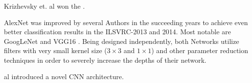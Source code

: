 Krizhevsky et. al \cite{AlexNet} won the .

AlexNet was improved by several Authors in the succeeding years to achieve even better classification results in the ILSVRC-2013 and 2014. Most notable are GoogLeNet \cite{googLeNeT} and VGG16 \cite{VGG16}. Being designed independently, both Networks utilize filters with very small kernel size ($3\times 3$ and $1 \times 1$) and other parameter reduction techniques in order to severely increase the depths of their network.


\cite{AlexNet} al introduced a novel \gls{CNN} architecture. 

\fi







